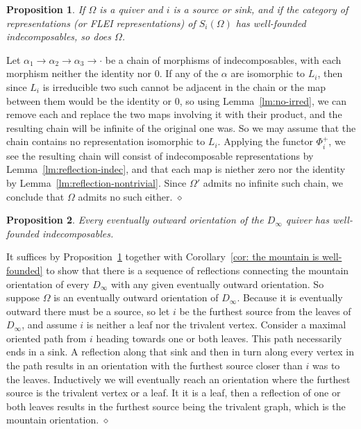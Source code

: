 \documentclass{article}
\newtheorem{proposition}{Proposition}[section]
\newenvironment{proof}{\vspace*{2ex}\noindent {\em Proof:}
}{\hfill $\diamond$ \\[2ex]}
\begin{document}
\begin{proposition} \label{pr: reflection preserves well-founded}
  If $\Omega$ is a quiver and $i$ is a source or sink, and if the category of representations (or FLEI representations) of $S_i(\Omega)$ has well-founded indecomposables, so does $\Omega$.
\end{proposition}

\begin{proof}
  Let $\alpha_1 \to \alpha_2 \to \alpha_3 \to \cdot$ be a chain of morphisms of indecomposables, with each morphism neither the identity nor $0$.  If any of the $\alpha$ are isomorphic to $L_i$, then since $L_i$ is irreducible two such cannot be adjacent in the chain or the map between them would be the identity or $0$, so using Lemma~\ref{lm:no-irred}, we can remove each and replace the two maps involving it with their product, and the resulting chain will be infinite of the original one was.  So we may assume that the chain contains no representation isomorphic to $L_i$.  Applying the functor $\Phi_i^+$, we see the resulting chain will consist of indecomposable representations by Lemma~\ref{lm:reflection-indec}, and that each map is niether zero nor the identity by Lemma~\ref{lm:reflection-nontrivial}.  Since $\Omega'$ admits no infinite such chain, we conclude that $\Omega$ admits no such either.  
\end{proof}


\begin{proposition}
 Every eventually outward orientation of the $D_\infty$ quiver has well-founded indecomposables.
\end{proposition}

\begin{proof}
 It suffices by Proposition~\ref{pr: reflection preserves well-founded} together with Corollary~\ref{cor: the mountain is well-founded} to show that there is a sequence of reflections connecting the mountain orientation of every $D_\infty$ with any given eventually outward orientation. So suppose $\Omega$ is an eventually outward orientation  of $D_\infty$.  Because it is eventually outward   there must be a source, so let $i$ be the furthest source from the leaves of $D_\infty$, and assume $i$ is neither a leaf nor the trivalent vertex.  Consider a maximal oriented path from $i$ heading towards one or both leaves. This path necessarily ends in a sink. A reflection along that sink and then in turn along every vertex in the path results in an orientation with the furthest source closer than $i$ was to the leaves.  Inductively we will eventually reach an orientation where the furthest source is the trivalent vertex or a leaf.  It it is a leaf, then a reflection of one or both leaves results in the furthest source being the trivalent graph, which is the mountain orientation.   
\end{proof}
\end{document}

